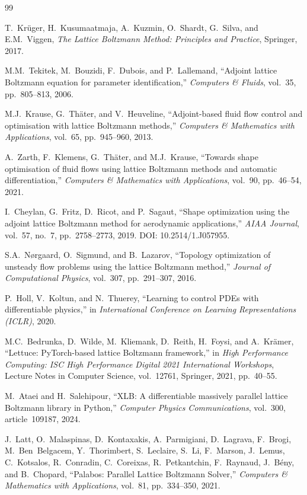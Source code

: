 \documentclass[10pt,twocolumn]{article}
\begin{document}
\begin{thebibliography}{99}

T.~Kr\"uger, H.~Kusumaatmaja, A.~Kuzmin, O.~Shardt, G.~Silva, and
E.M.~Viggen, \emph{The Lattice Boltzmann Method: Principles and
Practice}, Springer, 2017.

M.M.~Tekitek, M.~Bouzidi, F.~Dubois, and P.~Lallemand,
``Adjoint lattice Boltzmann equation for parameter identification,''
\emph{Computers \& Fluids}, vol.~35, pp.~805--813, 2006.

M.J.~Krause, G.~Th\"ater, and V.~Heuveline,
``Adjoint-based fluid flow control and optimisation with lattice
Boltzmann methods,'' \emph{Computers \& Mathematics with Applications},
vol.~65, pp.~945--960, 2013.

A.~Zarth, F.~Klemens, G.~Th\"ater, and M.J.~Krause,
``Towards shape optimisation of fluid flows using lattice Boltzmann
methods and automatic differentiation,''
\emph{Computers \& Mathematics with Applications}, vol.~90,
pp.~46--54, 2021.

I.~Cheylan, G.~Fritz, D.~Ricot, and P.~Sagaut,
``Shape optimization using the adjoint lattice Boltzmann method for
aerodynamic applications,''
\emph{AIAA Journal}, vol.~57, no.~7, pp.~2758--2773, 2019.
DOI: 10.2514/1.J057955.

S.A.~N{\o}rgaard, O.~Sigmund, and B.~Lazarov,
``Topology optimization of unsteady flow problems using the lattice
Boltzmann method,''
\emph{Journal of Computational Physics}, vol.~307, pp.~291--307, 2016.

P.~Holl, V.~Koltun, and N.~Thuerey,
``Learning to control PDEs with differentiable physics,''
in \emph{International Conference on Learning Representations (ICLR)},
2020.

M.C.~Bedrunka, D.~Wilde, M.~Kliemank, D.~Reith, H.~Foysi, and
A.~Kr\"amer,
``Lettuce: PyTorch-based lattice Boltzmann framework,''
in \emph{High Performance Computing: ISC High Performance Digital
2021 International Workshops}, Lecture Notes in Computer Science,
vol.~12761, Springer, 2021, pp.~40--55.

M.~Ataei and H.~Salehipour,
``XLB: A differentiable massively parallel lattice Boltzmann library
in Python,''
\emph{Computer Physics Communications}, vol.~300, article~109187,
2024.

J.~Latt, O.~Malaspinas, D.~Kontaxakis, A.~Parmigiani, D.~Lagrava,
F.~Brogi, M.~Ben~Belgacem, Y.~Thorimbert, S.~Leclaire, S.~Li,
F.~Marson, J.~Lemus, C.~Kotsalos, R.~Conradin, C.~Coreixas,
R.~Petkantchin, F.~Raynaud, J.~B\'eny, and B.~Chopard,
``Palabos: Parallel Lattice Boltzmann Solver,''
\emph{Computers \& Mathematics with Applications}, vol.~81,
pp.~334--350, 2021.


\end{thebibliography}
\end{document}
